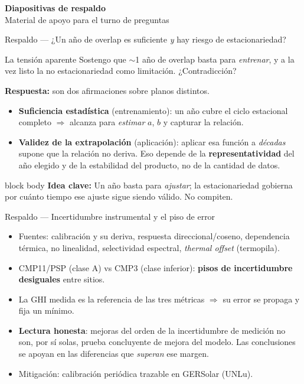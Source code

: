 \documentclass[aspectratio=169,11pt]{beamer}
\newcommand{\clave}[1]{%
  \begin{beamercolorbox}[wd=\linewidth,sep=6pt,rounded=true]{block body}%
    \footnotesize\textbf{\color{primary}Idea clave: }#1%
  \end{beamercolorbox}}
\begin{document}
\begin{frame}[plain]
  \centering\vfill
  {\color{primary}\Large\bfseries Diapositivas de respaldo}\\[0.4em]
  {\color{midgray}\footnotesize Material de apoyo para el turno de preguntas}
  \vfill
\end{frame}

\begin{frame}{Respaldo — ¿Un año de overlap es suficiente \emph{y} hay riesgo de estacionariedad?}
  \footnotesize
  \begin{block}{La tensión aparente}
    \scriptsize Sostengo que $\sim$1 año de overlap basta para \emph{entrenar}, y a la vez listo la no estacionariedad como limitación. ¿Contradicción?
  \end{block}
  \textbf{Respuesta:} son dos afirmaciones sobre planos distintos.
  \begin{itemize}
    \item \textbf{Suficiencia estadística} (entrenamiento): un año cubre el ciclo estacional completo $\Rightarrow$ alcanza para \emph{estimar} $a$, $b$ y capturar la relación.
    \item \textbf{Validez de la extrapolación} (aplicación): aplicar esa función a \emph{décadas} supone que la relación no deriva. Eso depende de la \textbf{representatividad} del año elegido y de la estabilidad del producto, no de la cantidad de datos.
  \end{itemize}
  \clave{Un año basta para \emph{ajustar}; la estacionariedad gobierna por cuánto tiempo ese ajuste sigue siendo válido. No compiten.}
\end{frame}

\begin{frame}{Respaldo — Incertidumbre instrumental y el piso de error}
  \scriptsize
  \begin{itemize}
    \item Fuentes: calibración y su deriva, respuesta direccional/coseno, dependencia térmica, no linealidad, selectividad espectral, \emph{thermal offset} (termopila).
    \item CMP11/PSP (clase A) vs CMP3 (clase inferior): \textbf{pisos de incertidumbre desiguales} entre sitios.
    \item La GHI medida es la referencia de las tres métricas $\Rightarrow$ su error se propaga y fija un mínimo.
    \item \textbf{Lectura honesta}: mejoras del orden de la incertidumbre de medición no son, por sí solas, prueba concluyente de mejora del modelo. Las conclusiones se apoyan en las diferencias que \emph{superan} ese margen.
    \item Mitigación: calibración periódica trazable en GERSolar (UNLu).
  \end{itemize}
\end{frame}
\end{document}
